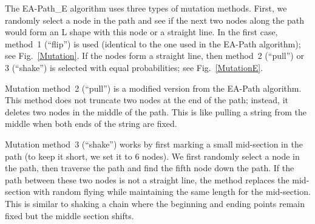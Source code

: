The EA-Path\_E algorithm uses three types of mutation methods. First, we randomly select a node in the path and see if the next two nodes along the path would form an L shape with this node or a straight line. In the first case, method~1 (``flip'') is used (identical to the one used in the EA-Path algorithm); see Fig.~\ref{Mutation}. If the nodes form a straight line, then method~2 (``pull'') or 3 (``shake'') is selected with equal probabilities; see Fig.~\ref{MutationE}.

Mutation method~2 (``pull'') is a modified version from the EA-Path algorithm. This method does not truncate two nodes at the end of the path; instead, it deletes two nodes in the middle of the path. This is like pulling a string from the middle when both ends of the string are fixed.

Mutation method~3 (``shake'') works by first marking a small mid-section in the path (to keep it short, we set it to 6 nodes). We first randomly select a node in the path, then traverse the path and find the fifth node down the path. If the path between these two nodes is not a straight line, the method replaces the mid-section with random flying while maintaining the same length for the mid-section. This is similar to shaking a chain where the beginning and ending points remain fixed but the middle section shifts.



